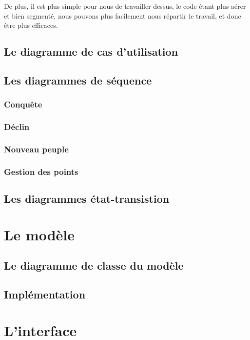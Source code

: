 \documentclass[11pt]{report}
\begin{document}
			De plus, il est plus simple pour nous de travailler dessus, le code étant plus aérer et bien segmenté, nous pouvons plus facilement nous répartir le travail, et donc être plus efficaces. 

	\section{Le diagramme de cas d'utilisation}

	\section{Les diagrammes de séquence}

		\subsection{Conquête}

		\subsection{Déclin}

		\subsection{Nouveau peuple}

		\subsection{Gestion des points}

	\section{Les diagrammes état-transistion}

\chapter{Le modèle}

	\section{Le diagramme de classe du modèle}

	\section{Implémentation}

\chapter{L'interface}
\end{document}

